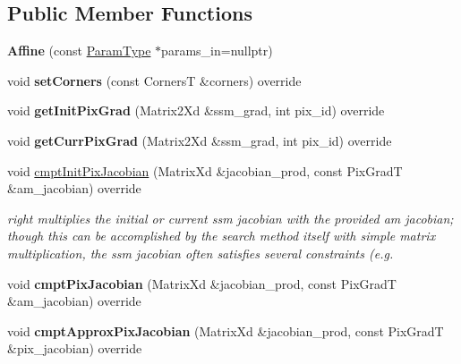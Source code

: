 \subsection*{Public Member Functions}
\begin{DoxyCompactItemize}
\item 
\hypertarget{classAffine_abe0773e87192293f2a3f003688fb9b58}{{\bfseries Affine} (const \hyperlink{structAffineParams}{Param\-Type} $\ast$params\-\_\-in=nullptr)}\label{classAffine_abe0773e87192293f2a3f003688fb9b58}

\item 
\hypertarget{classAffine_a715bc448785efa2d64904d737e07f7e4}{void {\bfseries set\-Corners} (const Corners\-T \&corners) override}\label{classAffine_a715bc448785efa2d64904d737e07f7e4}

\item 
\hypertarget{classAffine_a7640196abd86b4fa4b0c7a915ff65f0c}{void {\bfseries get\-Init\-Pix\-Grad} (Matrix2\-Xd \&ssm\-\_\-grad, int pix\-\_\-id) override}\label{classAffine_a7640196abd86b4fa4b0c7a915ff65f0c}

\item 
\hypertarget{classAffine_add3d8a33edf80035be84fdc70df4bf45}{void {\bfseries get\-Curr\-Pix\-Grad} (Matrix2\-Xd \&ssm\-\_\-grad, int pix\-\_\-id) override}\label{classAffine_add3d8a33edf80035be84fdc70df4bf45}

\item 
void \hyperlink{classAffine_a64387caa4e95c06167fc2d6afa453110}{cmpt\-Init\-Pix\-Jacobian} (Matrix\-Xd \&jacobian\-\_\-prod, const Pix\-Grad\-T \&am\-\_\-jacobian) override
\begin{DoxyCompactList}\small\item\em right multiplies the initial or current ssm jacobian with the provided am jacobian; though this can be accomplished by the search method itself with simple matrix multiplication, the ssm jacobian often satisfies several constraints (e.\-g. \end{DoxyCompactList}\item 
\hypertarget{classAffine_af92cc0960d824ee69279895cf6f16ec3}{void {\bfseries cmpt\-Pix\-Jacobian} (Matrix\-Xd \&jacobian\-\_\-prod, const Pix\-Grad\-T \&am\-\_\-jacobian) override}\label{classAffine_af92cc0960d824ee69279895cf6f16ec3}

\item 
\hypertarget{classAffine_a11de7d87156cb4ebb414f1859bda3e70}{void {\bfseries cmpt\-Approx\-Pix\-Jacobian} (Matrix\-Xd \&jacobian\-\_\-prod, const Pix\-Grad\-T \&pix\-\_\-jacobian) override}\label{classAffine_a11de7d87156cb4ebb414f1859bda3e70}


\end{DoxyCompactItemize}
